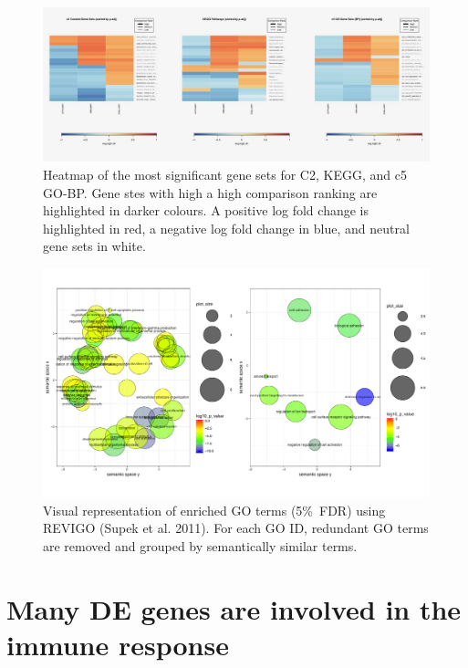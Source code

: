 \documentclass[12pt,a4paper,titlepage,twoside,openright]{book}
\begin{document}
\begin{mainmatter}
{{\begin{figure}[htb!]
\centering
\includegraphics[width=\textwidth,height=\textheight,keepaspectratio]{Figures/allHeatmapSummary_GeneSets.jpg}
\caption{Heatmap of the most significant gene sets for C2, KEGG, and c5 GO-BP. Gene stes with high a high comparison ranking are highlighted in darker colours. A positive log fold change is highlighted in red, a negative log fold change in blue, and neutral gene sets in white.}
\label{fig:c2 Heatmap Summary}
\end{figure}

\begin{figure}[htb!]
\centering
\includegraphics[width=\textwidth,height=\textheight,keepaspectratio]{Figures/RevigoPlots.pdf}
\caption{Visual representation of enriched GO terms (5\%\ FDR) using REVIGO (Supek et al. 2011).  For each GO ID, redundant GO terms are removed and grouped by semantically similar terms.}
\label{fig:Revigo}
\end{figure}

\section{Many DE genes are involved in the immune response}

}}
\end{mainmatter}
\end{document}
